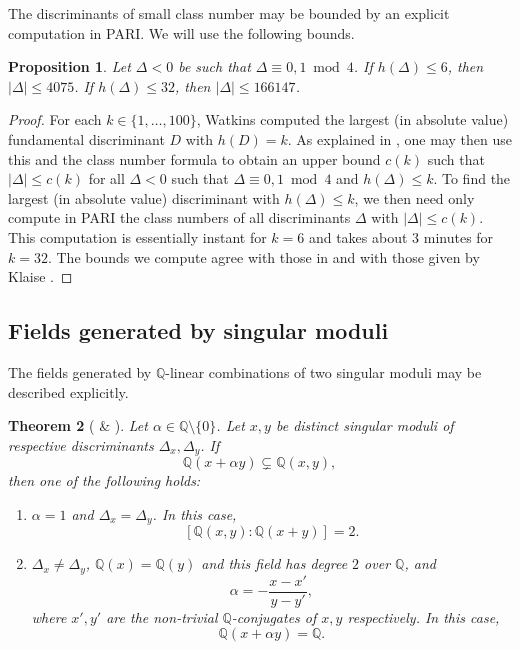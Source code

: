 \documentclass[11pt,a4paper, british]{amsart}
\newtheorem{thm}{Theorem}[section]
\newtheorem{prop}[thm]{Proposition}
\theoremstyle{definition}
\theoremstyle{remark}
\numberwithin{equation}{section}
\newcommand{\Q}{\mathbb{Q}} %
\begin{document}
The discriminants of small class number may be bounded by an explicit computation in PARI. We will use the following bounds.

\begin{prop}\label{prop:smallclass}
	Let $\Delta < 0$ be such that $\Delta \equiv 0, 1 \bmod 4$. If $h(\Delta) \leq 6$, then $\lvert \Delta \rvert \leq 4075$. If $h(\Delta) \leq 32$, then $\lvert \Delta \rvert \leq 166147$. 
\end{prop}

\begin{proof}
	For each $k \in \{1, \ldots, 100\}$, Watkins \cite[Table~4]{Watkins04} computed the largest (in absolute value) fundamental discriminant $D$ with $h(D) = k$. As explained in \cite[Proposition~2.1]{BiluGunTron22}, one may then use this and the class number formula \cite[Theorem~7.24]{Cox22} to obtain an upper bound $c(k)$ such that $\lvert \Delta \rvert \leq c(k)$ for all $\Delta < 0$ such that $\Delta \equiv 0, 1 \bmod 4$ and $h(\Delta) \leq k$. To find the largest (in absolute value) discriminant with $h(\Delta) \leq k$, we then need only compute in PARI the class numbers of all discriminants $\Delta$ with $\lvert \Delta \rvert \leq c(k)$. This computation is essentially instant for $k=6$ and takes about $3$ minutes for $k=32$. The bounds we compute agree with those in \cite[Proposition~2.1]{BiluGunTron22} and with those given by Klaise \cite[p.19]{Klaise12}.
\end{proof}

\subsection{Fields generated by singular moduli}\label{subsec:fieldgen}

The fields generated by $\Q$-linear combinations of two singular moduli may be described explicitly.

\begin{thm}[{\cite[Theorem~1.5]{BiluFayeZhu19} \& \cite[Theorem~4.1]{FayeRiffaut18}}]\label{thm:fields}
	Let $\alpha \in \Q \setminus \{0\}$. Let $x, y$ be distinct singular moduli of respective discriminants $\Delta_x, \Delta_y$. If 
	\[ \Q(x + \alpha y) \subsetneq \Q(x, y),\]
	then one of the following holds:
	\begin{enumerate}
		\item $\alpha = 1$ and $\Delta_x = \Delta_y$. In this case, 
		\[ [\Q(x, y) : \Q(x + y)] = 2.\]
		\item $\Delta_x \neq \Delta_y$, $\Q(x) = \Q(y)$ and this field has degree $2$ over $\Q$, and
		\[ \alpha = -\frac{x - x'}{y - y'},\]
		where $x', y'$ are the non-trivial $\Q$-conjugates of $x, y$ respectively. In this case,
		\[ \Q(x + \alpha y) = \Q.\]
	\end{enumerate}
\end{thm}
\end{document}
